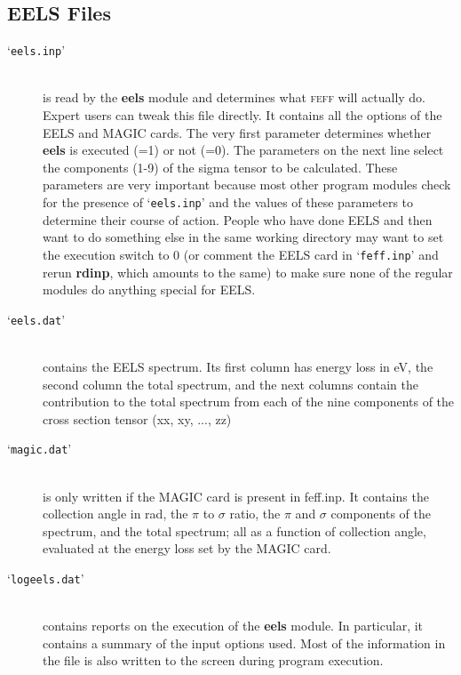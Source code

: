 \documentclass[11pt,oneside]{report} %
\newcommand{\program}[1]{\textsc{#1}}
\newcommand{\feff}{\program{feff}}
\newcommand{\file}[1]{`\texttt{#1}'}
\newcommand{\module}[1]{\textrm{\bf{#1}}}
\begin{document}
\begin{latexonly}
\subsection{EELS Files}
\label{sec:EELS-files}
\begin{description}
      \item[\file{eels.inp}]\hfill\\ is read by the \module{eels} module and 
        determines what {\feff} will actually do. Expert users can tweak this 
        file directly. It contains all the options of the 
        EELS and MAGIC cards. The very first 
        parameter determines whether \module{eels} is executed (=1) or not (=0). 
        The parameters on the next line select the components 
        (1-9) of the sigma tensor to be calculated.
        These parameters are very important because most other program modules check 
        for the presence of \file{eels.inp} and the values of these parameters 
        to determine their course of action. People who have done EELS and then 
        want to do something else in the same working directory may want to set 
        the execution switch to 0 (or comment the EELS card in \file{feff.inp} 
        and rerun \module{rdinp}, which amounts to the same) to make sure none 
        of the regular modules do anything special for EELS.
      \item[\file{eels.dat}]\hfill\\  contains the EELS spectrum. Its 
        first column has energy loss in eV, the second column the total 
        spectrum, and the next columns contain the contribution to the total 
        spectrum from each of the nine components of the cross section tensor (xx, xy, ..., zz)
      \item[\file{magic.dat}]\hfill\\  is only written if the MAGIC 
        card is present in feff.inp. It contains the collection angle in rad, the $\pi$ 
        to $\sigma$ ratio, the $\pi$ and $\sigma$ components of the spectrum, and the 
        total spectrum; all as a function of collection angle, evaluated at 
        the energy loss set by the MAGIC card.
      \item[\file{logeels.dat}]\hfill\\  contains reports on the 
        execution of the \module{eels} module. In particular, it contains a summary of the 
        input options used. Most of the information in the file is also 
        written to the screen during program execution.
\end{description}



\end{latexonly}
\end{document}
